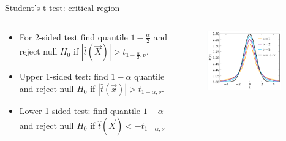 \documentclass[asd-beamer.tex]{subfiles}%
\begin{document}
\begin{wordonframe}{Student's t test: critical region}
\begin{columns}[T]
    \begin{column}{0.5\textwidth}
        \begin{itemize}
            \item For 2-sided test find quantile $1-\frac{\alpha}{2}$ and reject null $H_0$ if $|\hat{t}(\vec{X})|>t_{1-\frac{\alpha}{2},\nu}$.
            \item Upper 1-sided test: find $1-\alpha$ quantile and reject null $H_0$ if $|\hat{t}(\vec{x})|>t_{1-\alpha,\nu}$.
            \item Lower 1-sided test: find quantile $1-\alpha$ and reject null $H_0$ if $\hat{t}(\vec{X})<-t_{1-\alpha,\nu}$
        \end{itemize}
    \end{column}
    \begin{column}{0.5\textwidth}
        \begin{figure}[!ht]\includegraphics[trim={0cm 0cm 0 0},clip, keepaspectratio,width=0.9\textwidth]{figures/internet/tstudent}\label{fig:tstudent}\end{figure}
    \end{column}
\end{columns}
\end{wordonframe}
\end{document}
